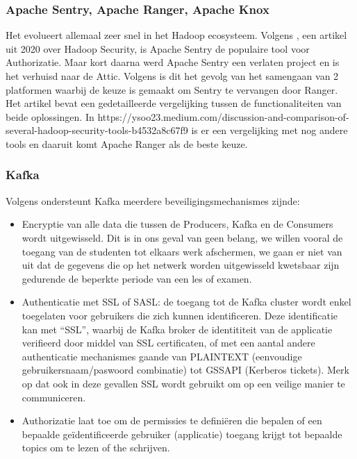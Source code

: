 \subsubsection{Apache Sentry, Apache Ranger, Apache Knox}
Het evolueert allemaal zeer snel in het Hadoop ecosysteem. Volgens \textcite{Chu2020}, een artikel uit 2020 over Hadoop Security, is Apache Sentry de populaire tool voor Authorizatie. Maar kort daarna werd Apache Sentry een verlaten project en is het verhuisd naar de Attic.
\newline
Volgens \textcite{Anand2021} is dit het gevolg van het samengaan van 2 platformen waarbij de keuze is gemaakt om Sentry te vervangen door Ranger. Het artikel bevat een gedetailleerde vergelijking tussen de functionaliteiten van beide oplossingen.
\newline
In https://ysoo23.medium.com/discussion-and-comparison-of-several-hadoop-security-tools-b4532a8c67f9 is er een vergelijking met nog andere tools en daaruit komt Apache Ranger als de beste keuze.


\subsubsection {Kafka}
Volgens \textcite{Maarek2018} ondersteunt Kafka meerdere beveiligingsmechanismes zijnde:
\begin{itemize}
    \item Encryptie van alle data die tussen de Producers, Kafka en de Consumers wordt uitgewisseld. Dit is in ons geval van geen belang, we willen vooral de toegang van de studenten tot elkaars werk afschermen, we gaan er niet van uit dat de gegevens die op het netwerk worden uitgewisseld kwetsbaar zijn gedurende de beperkte periode van een les of examen.
    \item Authenticatie met SSL of SASL: de toegang tot de Kafka cluster wordt enkel toegelaten voor gebruikers die zich kunnen identificeren. Deze identificatie kan met ``SSL'', waarbij de Kafka broker de identititeit van de applicatie verifieerd door middel van SSL certificaten, of met een aantal andere authenticatie mechanismes gaande van PLAINTEXT (eenvoudige gebruikersnaam/paswoord combinatie) tot GSSAPI (Kerberos tickets). Merk op dat ook in deze gevallen SSL wordt gebruikt om op een veilige manier te communiceren.
    \item Authorizatie laat toe om de permissies te definiëren die bepalen of een bepaalde geïdentificeerde gebruiker (applicatie) toegang krijgt tot bepaalde topics om te lezen of the schrijven.
\end{itemize}

